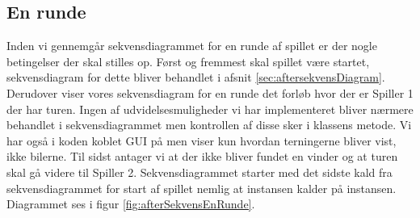 \subsection{En runde}\label{subsec:afterEnRunde}
Inden vi gennemgår sekvensdiagrammet for en runde af spillet er der nogle betingelser der skal stilles op. Først og fremmest skal spillet være startet, sekvensdiagram for dette bliver behandlet i afsnit \vref{sec:aftersekvensDiagram}. Derudover viser vores sekvensdiagram for en runde det forløb hvor der er Spiller 1 der har turen. Ingen af udvidelsesmuligheder vi har implementeret bliver nærmere behandlet i sekvensdiagrammet men kontrollen af disse sker i  klassens  metode. Vi har også i koden koblet GUI på men viser kun hvordan terningerne bliver vist, ikke bilerne. Til sidst antager vi at der ikke bliver fundet en vinder og at turen skal gå videre til Spiller 2. Sekvensdiagrammet starter med det sidste kald fra sekvensdiagrammet for start af spillet nemlig at  instansen kalder  på  instansen. Diagrammet ses i figur \vref{fig:afterSekvensEnRunde}.

